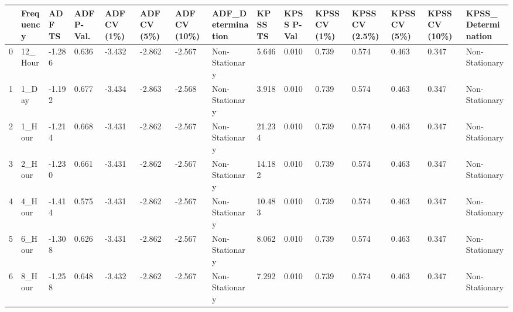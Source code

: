 \begin{tabular}{lllllllllllllll}
\toprule
 & Frequency & ADF TS & ADF P-Val. & ADF CV (1\%) & ADF CV (5\%) & ADF CV (10\%) & ADF_Determination & KPSS TS & KPSS P-Val & KPSS CV (1\%) & KPSS CV (2.5\%) & KPSS CV (5\%) & KPSS CV (10\%) & KPSS_Determination \\
\midrule
0 & 12_Hour & -1.286 & 0.636 & -3.432 & -2.862 & -2.567 & Non-Stationary & 5.646 & 0.010 & 0.739 & 0.574 & 0.463 & 0.347 & Non-Stationary \\
1 & 1_Day & -1.192 & 0.677 & -3.434 & -2.863 & -2.568 & Non-Stationary & 3.918 & 0.010 & 0.739 & 0.574 & 0.463 & 0.347 & Non-Stationary \\
2 & 1_Hour & -1.214 & 0.668 & -3.431 & -2.862 & -2.567 & Non-Stationary & 21.234 & 0.010 & 0.739 & 0.574 & 0.463 & 0.347 & Non-Stationary \\
3 & 2_Hour & -1.230 & 0.661 & -3.431 & -2.862 & -2.567 & Non-Stationary & 14.182 & 0.010 & 0.739 & 0.574 & 0.463 & 0.347 & Non-Stationary \\
4 & 4_Hour & -1.414 & 0.575 & -3.431 & -2.862 & -2.567 & Non-Stationary & 10.483 & 0.010 & 0.739 & 0.574 & 0.463 & 0.347 & Non-Stationary \\
5 & 6_Hour & -1.308 & 0.626 & -3.431 & -2.862 & -2.567 & Non-Stationary & 8.062 & 0.010 & 0.739 & 0.574 & 0.463 & 0.347 & Non-Stationary \\
6 & 8_Hour & -1.258 & 0.648 & -3.432 & -2.862 & -2.567 & Non-Stationary & 7.292 & 0.010 & 0.739 & 0.574 & 0.463 & 0.347 & Non-Stationary \\
\bottomrule
\end{tabular}
